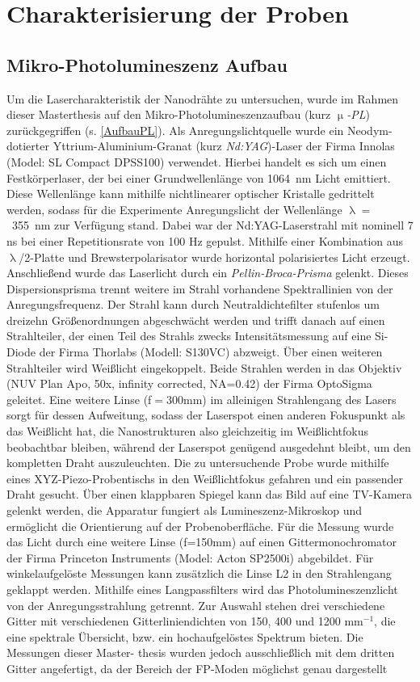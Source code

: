 \section{Charakterisierung der Proben}
\subsection{Mikro-Photolumineszenz Aufbau}
Um die Lasercharakteristik der Nanodrähte zu untersuchen, wurde im Rahmen dieser Masterthesis auf den Mikro-Photolumineszenzaufbau (kurz \textit{$\upmu$-PL}) zurückgegriffen (s. \autoref{AufbauPL}). Als Anregungslichtquelle wurde ein Neodym-dotierter Yttrium-Aluminium-Granat (kurz \textit{Nd:YAG})-Laser der Firma Innolas (Model: SL Compact DPSS100) verwendet. Hierbei handelt es sich um einen Festkörperlaser, der bei einer Grundwellenlänge von \mbox{1064 nm} Licht emittiert. Diese Wellenlänge kann mithilfe nichtlinearer optischer Kristalle gedrittelt werden, sodass für die Experimente Anregungslicht der Wellenlänge \mbox{$\uplambda=$  355 nm} zur Verfügung stand. Dabei war der Nd:YAG-Laserstrahl mit nominell 7 ns bei einer Repetitionsrate von 100 Hz gepulst. Mithilfe  einer Kombination aus $\uplambda$/2-Platte und Brewsterpolarisator wurde horizontal polarisiertes Licht erzeugt. Anschließend wurde das Laserlicht durch ein \textit{Pellin-Broca-Prisma} gelenkt. Dieses Dispersionsprisma trennt weitere im Strahl vorhandene Spektrallinien von der Anregungsfrequenz. Der Strahl kann durch Neutraldichtefilter stufenlos um dreizehn Größenordnungen abgeschwächt werden und trifft danach auf einen Strahlteiler, der einen Teil des Strahls zwecks Intensitätsmessung auf eine Si-Diode der Firma Thorlabs (Modell: S130VC) abzweigt. Über einen weiteren Strahlteiler wird Weißlicht eingekoppelt. Beide Strahlen werden in das Objektiv (NUV Plan Apo, 50x, infinity corrected, NA=0.42) der Firma OptoSigma geleitet. Eine weitere Linse (f$=$300mm) im alleinigen Strahlengang des Lasers sorgt für dessen Aufweitung, sodass der Laserspot einen anderen Fokuspunkt als das Weißlicht hat, die Nanostrukturen also gleichzeitig im Weißlichtfokus beobachtbar bleiben, während der Laserspot genügend ausgedehnt bleibt, um den kompletten Draht auszuleuchten. Die zu untersuchende Probe wurde mithilfe eines XYZ-Piezo-Probentischs in den Weißlichtfokus gefahren und ein passender Draht gesucht. Über einen klappbaren Spiegel kann das Bild auf eine TV-Kamera gelenkt werden, die Apparatur fungiert als Lumineszenz-Mikroskop und ermöglicht die Orientierung auf der Probenoberfläche. Für die Messung wurde das Licht durch eine weitere Linse (f=150mm) auf einen Gittermonochromator der Firma Princeton Instruments (Model: Acton SP2500i) abgebildet. Für winkelaufgelöste Messungen kann zusätzlich die Linse L2 in den Strahlengang geklappt werden. Mithilfe eines Langpassfilters wird das Photolumineszenzlicht von der Anregungsstrahlung getrennt.  Zur Auswahl stehen drei verschiedene Gitter mit verschiedenen Gitterliniendichten von 150, 400 und 1200 mm$^{-1}$, die eine spektrale Übersicht, bzw. ein hochaufgelöstes Spektrum bieten. Die Messungen dieser Master- thesis wurden jedoch ausschließlich mit dem dritten Gitter angefertigt, da der Bereich der FP-Moden möglichst genau dargestellt 
